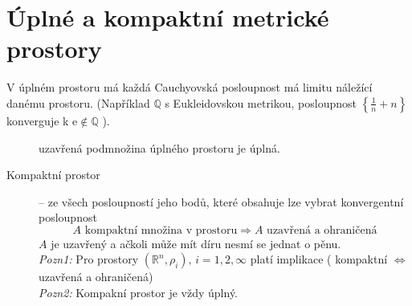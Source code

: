 \documentclass[a4paper, twoside,%
12pt]{article}
\newcommand{\R}{\mathbb{R}}
\newcommand{\e}{\mathrm{e}} %
\newcommand{\Q}{\mathbb{Q}}
\begin{document}
\section{Úplné a kompaktní metrické prostory}
V úplném prostoru má každá Cauchyovská posloupnost má limitu náležící danému prostoru. ({Například} $\Q$ s Eukleidovskou metrikou, posloupnost $\left\lbrace\frac{1}{n}+n\right\rbrace$ konverguje k $\e \notin \Q$ ).
\begin{description}
        \item[] uzavřená podmnožina úplného prostoru je úplná.
        \item[Kompaktní prostor] -- ze všech posloupností jeho bodů, které obsahuje lze vybrat konvergentní posloupnost
        $$ A \text{ kompaktní množina v prostoru} \Rightarrow A \text{ uzavřená a ohraničená} $$
        $A$ je uzavřený a ačkoli může mít díru nesmí se jednat o pěnu.\\
        \emph{Pozn1:} Pro prostory $(\R^n, \rho_i),\, i = 1,2, \infty$ platí implikace ( kompaktní $\Leftrightarrow$ uzavřená a ohraničená)\\
        \emph{Pozn2:} Kompakní prostor je vždy úplný.
\end{description}
\end{document}
